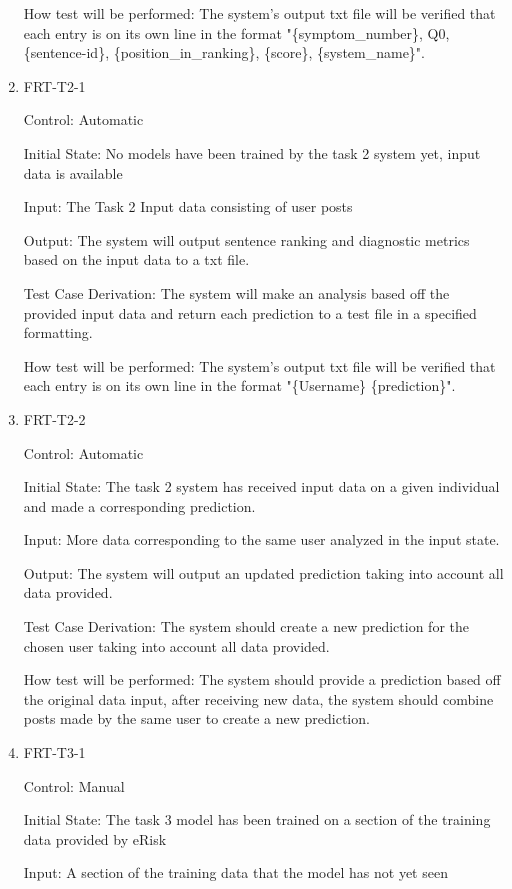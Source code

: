 \documentclass[12pt, titlepage]{article}
\begin{document}
\begin{enumerate}
How test will be performed: The system's output txt file will be verified that each entry is on its own line in the format "\{symptom\_number\}, Q0, \{sentence-id\}, \{position\_in\_ranking\}, \{score\}, \{system\_name\}".

\item{FRT-T2-1\\}

Control: Automatic

Initial State: No models have been trained by the task 2 system yet, input data is available

Input: The Task 2 Input data consisting of user posts

Output: The system will output sentence ranking and diagnostic metrics based on the input data to a txt file.

Test Case Derivation: The system will make an analysis based off the provided input data and return each prediction to a test file in a specified formatting.

How test will be performed: The system's output txt file will be verified that each entry is on its own line in the format "\{Username\} \{prediction\}".

\item{FRT-T2-2\\}

Control: Automatic

Initial State: The task 2 system has received input data on a given individual and made a corresponding prediction.

Input: More data corresponding to the same user analyzed in the input state.

Output: The system will output an updated prediction taking into account all data provided.

Test Case Derivation: The system should create a new prediction for the chosen user taking into account all data provided.

How test will be performed: The system should provide a prediction based off the original data input, after receiving new data, the system should combine posts made by the same user to create a new prediction. 

\item{FRT-T3-1\\}

Control: Manual

Initial State: The task 3 model has been trained on a section of the training data provided by eRisk

Input: A section of the training data that the model has not yet seen


\end{enumerate}
\end{document}
